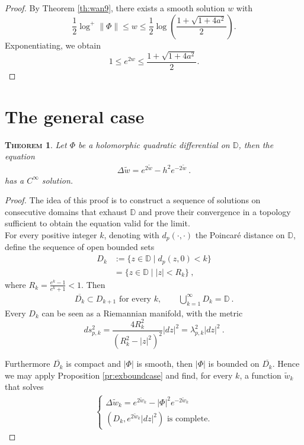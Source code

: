 \documentclass[a4paper,11pt,openright,twoside]{book}
\newcommand{\1}{\mathds{1}}
\theoremstyle{plain}
\newtheorem{thm}{\textsc{Theorem}}[chapter]
\theoremstyle{definition}
\theoremstyle{remark}
\begin{document}
\begin{proof}
By Theorem \ref{th:wan9}, there exists a smooth solution $w$ with
\[
\frac12\log^+\|\Phi\|
\leq
w
\leq
\frac12\log\left(\frac{1+\sqrt{1+4a^2}}{2}\right).
\]
Exponentiating, we obtain
\[
1\leq e^{2w}\leq \frac{1+\sqrt{1+4a^2}}{2}.
\]
\end{proof}
\section{The general case}
\begin{thm}
	Let $\Phi$ be a holomorphic quadratic differential on $\mathbb{D}$, then the equation 
	\begin{align*}
		\Delta\tilde w = e^{2\tilde w} - h^{2} e^{-2\tilde w}
	\ . 
	\end{align*}
	 has a $C^\infty$ solution.
\end{thm}
\begin{proof}
	The idea of this proof is to construct a sequence of solutions on consecutive domains that exhaust $\mathbb{D}$ and prove their convergence in a topology sufficient to obtain the equation valid for the limit.\\

	For every positive integer $k$, denoting with $d_p(\cdot,\cdot)$ the Poincaré distance on $\mathbb{D}$, define the sequence of open bounded sets
	\begin{align*}
		D_k &:= \{ z\in \mathbb{D} \mid d_p(z,0) < k\}   \\
		&= \{ z\in \mathbb{D} \mid |z|< R_k \} 
	\ , 
	\end{align*}
	where $R_k = \frac{e^k-1}{e^k+1}<1$.
	Then
	\begin{align*}
		\overline{D_k} \subset D_{k+1}\text{ for every }k,\qquad \bigcup_{k=1}^\infty D_k = \mathbb{D}
	\ . 
	\end{align*}
	Every $D_k$ can be seen as a Riemannian manifold, with the metric 
	\[
	ds_{p,k}^2 = \frac{4R_k^2}{(R_k^2-|z|^2)^2} |dz|^2 = \lambda^2_{p,k}|dz|^2
	\ . 
	\]

	Furthermore $\overline{D_k}$ is compact and $|\Phi|$ is smooth, then $|\Phi|$ is bounded on $\overline{D_k}$.
	Hence we may apply Proposition \ref{pr:exboundcase} and find, for every $k$, a function $\tilde w_k$ that solves
	\begin{align*}
		\begin{cases}
			\Delta \tilde w_k = e^{2\tilde w_k}-|\Phi|^2 e^{-2\tilde w_k}\\
			(D_k,e^{2\tilde w_k}|dz|^2) \text{ is complete.}
		\end{cases}
	\end{align*}
	

\end{proof}
\end{document}
